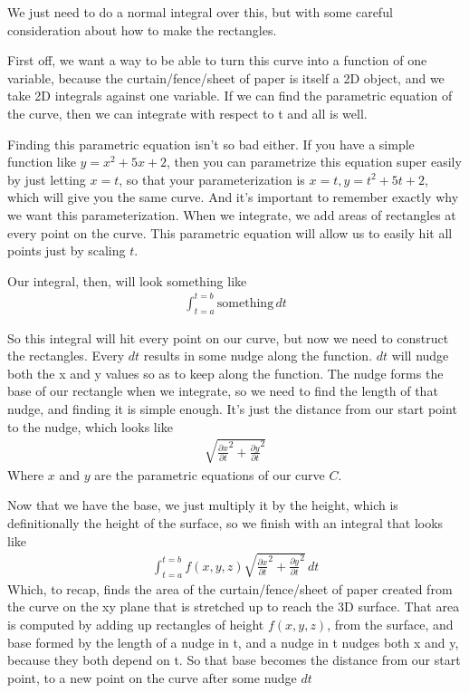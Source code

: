 \documentclass[12pt, letterpaper]{article}
\begin{document}
We just need to do a normal integral over this, but with some careful consideration about how to make the rectangles.

First off, we want a way to be able to turn this curve into a function of one variable, because the curtain/fence/sheet of paper is itself a 2D object,
and we take 2D integrals against one variable.
If we can find the parametric equation of the curve, then we can integrate with respect to t and all is well.

Finding this parametric equation isn't so bad either.
If you have a simple function like $y = x^2 + 5x + 2$, then you can parametrize this equation super easily by just letting $x = t$,
so that your parameterization is $x = t, y = t^2 + 5t + 2$, which will give you the same curve.
And it's important to remember exactly why we want this parameterization.
When we integrate, we add areas of rectangles at every point on the curve.
This parametric equation will allow us to easily hit all points just by scaling $t$.

Our integral, then, will look something like
\begin{gather*}
    \int_{t=a}^{t=b} \text{something} \, dt
\end{gather*}

So this integral will hit every point on our curve, but now we need to construct the rectangles.
Every $dt$ results in some nudge along the function.
$dt$ will nudge both the x and y values so as to keep along the function.
The nudge forms the base of our rectangle when we integrate, so we need to find the length of that nudge, and finding it is simple enough.
It's just the distance from our start point to the nudge, which looks like
\begin{gather*}
    \sqrt{\frac{\partial x}{\partial t}^2 + \frac{\partial y}{\partial t}^2}
\end{gather*}
Where $x$ and $y$ are the parametric equations of our curve $C$.

Now that we have the base, we just multiply it by the height, which is definitionally the height of the surface, so we finish with an integral that looks like
\begin{gather*}
    \int_{t=a}^{t=b} f(x, y, z) \sqrt{\frac{\partial x}{\partial t}^2 + \frac{\partial y}{\partial t}^2} \, dt
\end{gather*}
Which, to recap, finds the area of the curtain/fence/sheet of paper created from the curve on the xy plane that is stretched up to reach the 3D surface.
That area is computed by adding up rectangles of height $f(x, y, z)$, from the surface, and base formed by the length of a nudge in t, and a nudge in t nudges both x and y, because they both depend on t.
So that base becomes the distance from our start point, to a new point on the curve after some nudge $dt$
\end{document}
